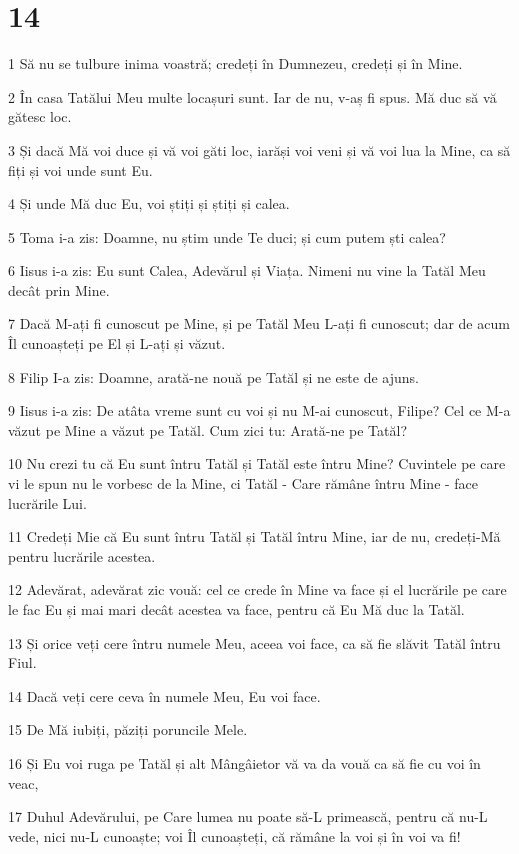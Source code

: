 \chapter{14}

\par 1 Să nu se tulbure inima voastră; credeți în Dumnezeu, credeți și în Mine.
\par 2 În casa Tatălui Meu multe locașuri sunt. Iar de nu, v-aș fi spus. Mă duc să vă gătesc loc.
\par 3 Și dacă Mă voi duce și vă voi găti loc, iarăși voi veni și vă voi lua la Mine, ca să fiți și voi unde sunt Eu.
\par 4 Și unde Mă duc Eu, voi știți și știți și calea.
\par 5 Toma i-a zis: Doamne, nu știm unde Te duci; și cum putem ști calea?
\par 6 Iisus i-a zis: Eu sunt Calea, Adevărul și Viața. Nimeni nu vine la Tatăl Meu decât prin Mine.
\par 7 Dacă M-ați fi cunoscut pe Mine, și pe Tatăl Meu L-ați fi cunoscut; dar de acum Îl cunoașteți pe El și L-ați și văzut.
\par 8 Filip I-a zis: Doamne, arată-ne nouă pe Tatăl și ne este de ajuns.
\par 9 Iisus i-a zis: De atâta vreme sunt cu voi și nu M-ai cunoscut, Filipe? Cel ce M-a văzut pe Mine a văzut pe Tatăl. Cum zici tu: Arată-ne pe Tatăl?
\par 10 Nu crezi tu că Eu sunt întru Tatăl și Tatăl este întru Mine? Cuvintele pe care vi le spun nu le vorbesc de la Mine, ci Tatăl - Care rămâne întru Mine - face lucrările Lui.
\par 11 Credeți Mie că Eu sunt întru Tatăl și Tatăl întru Mine, iar de nu, credeți-Mă pentru lucrările acestea.
\par 12 Adevărat, adevărat zic vouă: cel ce crede în Mine va face și el lucrările pe care le fac Eu și mai mari decât acestea va face, pentru că Eu Mă duc la Tatăl.
\par 13 Și orice veți cere întru numele Meu, aceea voi face, ca să fie slăvit Tatăl întru Fiul.
\par 14 Dacă veți cere ceva în numele Meu, Eu voi face.
\par 15 De Mă iubiți, păziți poruncile Mele.
\par 16 Și Eu voi ruga pe Tatăl și alt Mângâietor vă va da vouă ca să fie cu voi în veac,
\par 17 Duhul Adevărului, pe Care lumea nu poate să-L primească, pentru că nu-L vede, nici nu-L cunoaște; voi Îl cunoașteți, că rămâne la voi și în voi va fi!
